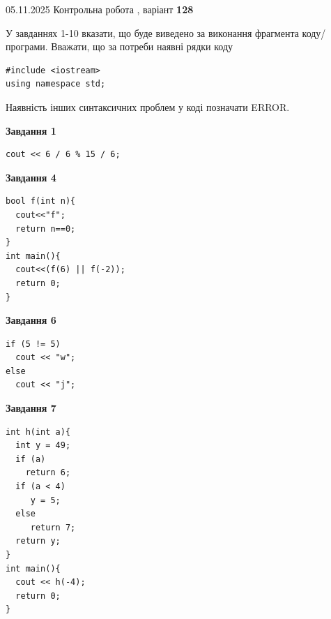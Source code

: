 \documentclass[12pt, ukrainian]{article}
\begin{document}
{\Large{05.11.2025 Контрольна робота , варіант  \No \textbf { 128 }\par}}
{
\begin {large}
У завданнях 1-10 вказати, що буде виведено за виконання фрагмента коду/про\-гра\-ми.
Вважати, що за потреби наявні рядки коду
\begin{verbatim}
#include <iostream>
using namespace std;
\end{verbatim}
Наявність інших синтаксичних проблем у коді позначати ERROR.

\begin{minipage}[t]{7.0cm}

\begin{center}
\textbf{Завдання 1}
\end{center}
\vspace{-8mm}

\begin{verbatim}
cout << 6 / 6 % 15 / 6;
\end{verbatim}



\begin{center}
\textbf{Завдання 4}
\end{center}
\vspace{-8mm}

\begin{verbatim}
bool f(int n){
  cout<<"f";
  return n==0;
}
int main(){
  cout<<(f(6) || f(-2));
  return 0;
}
\end{verbatim}



\begin{center}
\textbf{Завдання 6}
\end{center}
\vspace{-8mm}

\begin{verbatim}
if (5 != 5)
  cout << "w";
else
  cout << "j";
\end{verbatim}



\begin{center}
\textbf{Завдання 7}
\end{center}
\vspace{-8mm}

\begin{verbatim}
int h(int a){
  int y = 49;
  if (a)
    return 6;
  if (a < 4)
     y = 5;
  else
     return 7;
  return y;
}
int main(){
  cout << h(-4);
  return 0;
}
\end{verbatim}


\end{minipage}
\end{large}}
\end{document}
